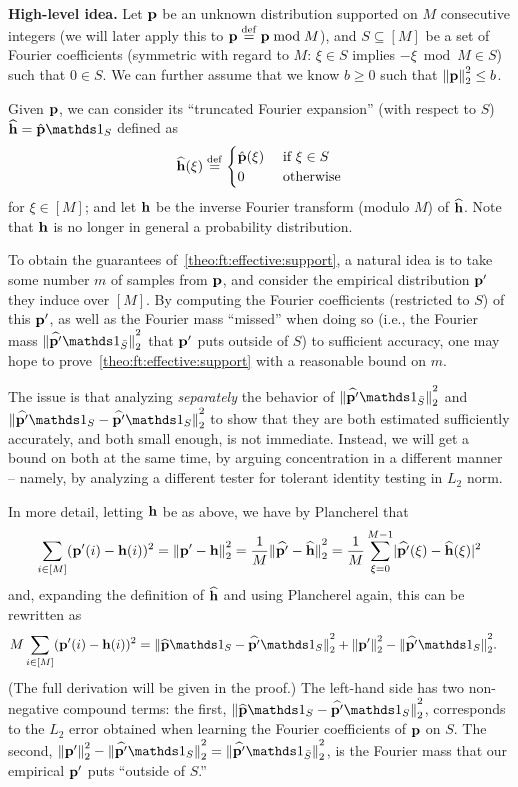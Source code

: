 \medskip

\noindent \textbf{High-level idea.} 
Let $\mathbf{p}$ be an unknown distribution supported on $M$ consecutive integers (we will later apply this to $\mathbf{p}\stackrel{\rm def}{=} \mathbf{p} \bmod M$), and $S\subseteq[M]$ be a set of Fourier coefficients (symmetric with regard to $M$: $\xi\in S$ implies $-\xi \bmod M \in S$) such that $0\in S$. We can further assume that we know $b\geq 0$ such that ${\lVert\mathbf{p}{\rVert}}_2^2 \leq b$.

Given $\mathbf{p}$, we can consider its ``truncated Fourier expansion'' (with respect to $S$) $\fourier{\h}=\hat{\q}\indicSet{S}$ defined as
\[
    \widehat{\mathbf{h}}(\xi) \stackrel{\rm def}{=}
      \begin{cases}
          \hat{\mathbf{p}}(\xi) & \text{ if } \xi\in S\\
          0 & \text{ otherwise}
      \end{cases}
\]
for $\xi\in[M]$; and let $\mathbf{h}$ be the inverse Fourier transform (modulo $M$) of $\widehat{\mathbf{h}}$. Note that $\mathbf{h}$ is no longer in general a probability distribution.\medskip

To obtain the guarantees of~\cref{theo:ft:effective:support}, a natural idea is to take some number $m$ of samples from $\mathbf{p}$, and consider the empirical distribution $\mathbf{p}'$ they induce over $[M]$. By computing the Fourier coefficients (restricted to $S$) of this $\mathbf{p}'$, as well as the Fourier mass ``missed'' when doing so (i.e., the Fourier mass $\normtwo{\fourier{\q'}\indicSet{\bar{S}}}^2$ that $\mathbf{p}'$ puts outside of $S$) to sufficient accuracy, one may hope to prove~\cref{theo:ft:effective:support} with a reasonable bound on $m$.

The issue is that analyzing \emph{separately} the behavior of $\normtwo{\fourier{\q'}\indicSet{\bar{S}}}^2$ and $\normtwo{\fourier{\q'}\indicSet{S}-\fourier{\q'}\indicSet{S}}^2$ to show that they are both estimated sufficiently accurately, and both small enough, is not immediate. Instead, we will get a bound on both at the same time, by arguing concentration in a different manner -- namely, by analyzing a different tester for tolerant identity testing in $L_2$ norm.

In more detail, letting $\mathbf{h}$ be as above, we have by Plancherel that
\[
  \sum_{i\in [M]} (\mathbf{p}'(i)-\mathbf{h}(i))^2 = {\lVert\mathbf{p}'-\mathbf{h}{\rVert}}_2^2 = \frac{1}{M}{\lVert\widehat{\mathbf{p}'}-\widehat{\mathbf{h}}{\rVert}}_2^2 = \frac{1}{M}\sum_{\xi=0}^{M-1} \lvert \widehat{\mathbf{p}'}(\xi)-\widehat{\mathbf{h}}(\xi) \rvert^2
\]
and, expanding the definition of $\widehat{\mathbf{h}}$ and using Plancherel again, this can be rewritten as
\begin{align*}
  M\sum_{i\in [M]} (\q'(i)-\h(i))^2 &=  \normtwo{\fourier{\q}\indicSet{S}-\fourier{\q'}\indicSet{S}}^2 + \normtwo{\q'}^2 - \normtwo{\fourier{\q'}\indicSet{S}}^2.
\end{align*}
(The full derivation will be given in the proof.) The left-hand side has two non-negative compound terms: the first, $\normtwo{\fourier{\p}\indicSet{S}-\fourier{\q'}\indicSet{S}}^2$, corresponds to the $L_2$ error obtained when learning the Fourier coefficients of $\mathbf{p}$ on $S$. The second, $\normtwo{\q'}^2 - \normtwo{\fourier{\q'}\indicSet{S}}^2 = \normtwo{\fourier{\q'}\indicSet{\bar{S}}}^2$, is the Fourier mass that our empirical $\mathbf{p}'$ puts ``outside of $S$.''

